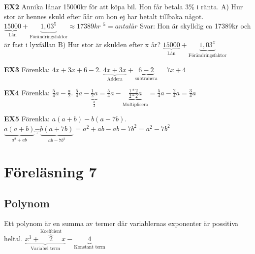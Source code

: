 \documentclass[a4paper,11pt]{article}
\begin{document}
\begin{flushleft}
\textbf{EX2}\newline
Annika lånar 15000kr för att köpa bil. Hon får betala 3\% i ränta.\newline
A) Hur stor är hennes skuld efter 5år om hon ej har betalt tillbaka något.\newline
$ \underbrace{15000}_{\text{Lån}} + \underbrace{1,03^5}_{\text{Förändringsfaktor}} \approx 17389kr $ \newline
\textit{$^5 = antal år$} \newline
Svar: Hon är skylldig ca 17389kr och är fast i lyxfällan \newline\newline
B) Hur stor är skulden efter x år?\newline\newline
$ \underbrace{15000}_{\text{Lån}} + \underbrace{1,03^x}_{\text{Förändringsfaktor}} $\newline\newline

\textbf{EX3}\newline
Förenkla: $4x+3x+6-2$.\newline\newline
$ \underbrace{4x+3x}_{\text{Addera}} + \underbrace{6-2}_{\text{subtrahera}} = 7x+4 $ \newline\newline

\textbf{EX4}\newline
Förenkla: $\frac{5}{4}a-\frac{a}{2}$.\newline\newline
$ \frac{5}{4}a-\underbrace{\frac{1}{2}a}_{\text{$\frac{a}{2}$}} = \frac{5}{4}a-\underbrace{\frac{1*2}{2*2}a}_{\text{Multiplicera}} = \frac{5}{4}a-\frac{2}{4}a = \frac{3}{4}a $\newline\newline

\textbf{EX5}\newline
Förenkla: $a(a+b)-b(a-7b)$.\newline\newline
$\underbrace{a(a+b)}_{\text{$a^2+ab$}} \underbrace{-}_{\text{-}} \underbrace{b(a+7b)}_{\text{$ab-7b^2$}} = a^2+ab-ab-7b^2 = a^2-7b^2 $\newline\newline


\newpage
\section{Föreläsning 7}
\subsection{Polynom}
Ett polynom är en summa av termer där variablernas exponenter är possitiva heltal.\newline
$ \underbrace{x^3+\overbrace{2}^{\text{Koeffcient}}x}_{\text{Variabel term}} - \underbrace{4}_{\text{Konstant term}} $

\end{flushleft}
\end{document}
